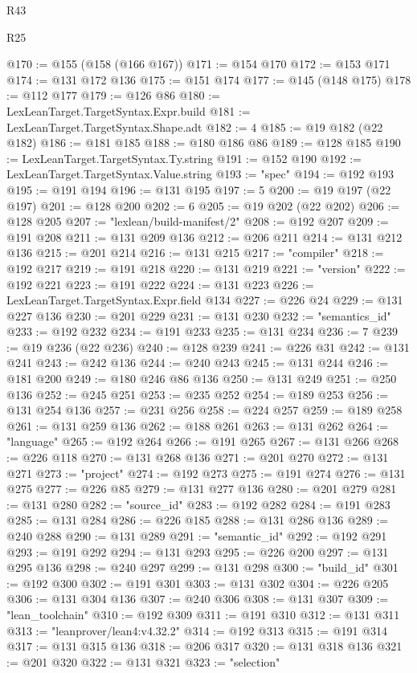 \begin{lexlean}{R43}
\begin{lexlean}{R25}
\begin{coremodule}
{{{{{{{{{{{{{{{{{{{{{{{{{{{{{{{{{{{{{{{{{{{{{{{{{{{{{{{{{{{{{{{{{{{{{{{{{{{{{{{{{{{{{{{{{{{{{{{{{{{{{{{{{{{{{{{{{{{{{{{{{{{{{{{{{{{{{{{{{{{{{{{{{{{{{{{{{{{{{{{{{{{{{{{{{{{{{{{{{{{{{{{{{{{{{{{{{@170 := @155 (@158 (@166 @167))
@171 := @154 @170
@172 := @153 @171
@174 := @131 @172 @136
@175 := @151 @174
@177 := @145 (@148 @175)
@178 := @112 @177
@179 := @126 @86
@180 := LexLeanTarget.TargetSyntax.Expr.build
@181 := LexLeanTarget.TargetSyntax.Shape.adt
@182 := 4
@185 := @19 @182 (@22 @182)
@186 := @181 @185
@188 := @180 @186 @86
@189 := @128 @185
@190 := LexLeanTarget.TargetSyntax.Ty.string
@191 := @152 @190
@192 := LexLeanTarget.TargetSyntax.Value.string
@193 := "spec"
@194 := @192 @193
@195 := @191 @194
@196 := @131 @195
@197 := 5
@200 := @19 @197 (@22 @197)
@201 := @128 @200
@202 := 6
@205 := @19 @202 (@22 @202)
@206 := @128 @205
@207 := "lexlean/build-manifest/2"
@208 := @192 @207
@209 := @191 @208
@211 := @131 @209 @136
@212 := @206 @211
@214 := @131 @212 @136
@215 := @201 @214
@216 := @131 @215
@217 := "compiler"
@218 := @192 @217
@219 := @191 @218
@220 := @131 @219
@221 := "version"
@222 := @192 @221
@223 := @191 @222
@224 := @131 @223
@226 := LexLeanTarget.TargetSyntax.Expr.field @134
@227 := @226 @24
@229 := @131 @227 @136
@230 := @201 @229
@231 := @131 @230
@232 := "semantics_id"
@233 := @192 @232
@234 := @191 @233
@235 := @131 @234
@236 := 7
@239 := @19 @236 (@22 @236)
@240 := @128 @239
@241 := @226 @31
@242 := @131 @241
@243 := @242 @136
@244 := @240 @243
@245 := @131 @244
@246 := @181 @200
@249 := @180 @246 @86 @136
@250 := @131 @249
@251 := @250 @136
@252 := @245 @251
@253 := @235 @252
@254 := @189 @253
@256 := @131 @254 @136
@257 := @231 @256
@258 := @224 @257
@259 := @189 @258
@261 := @131 @259 @136
@262 := @188 @261
@263 := @131 @262
@264 := "language"
@265 := @192 @264
@266 := @191 @265
@267 := @131 @266
@268 := @226 @118
@270 := @131 @268 @136
@271 := @201 @270
@272 := @131 @271
@273 := "project"
@274 := @192 @273
@275 := @191 @274
@276 := @131 @275
@277 := @226 @85
@279 := @131 @277 @136
@280 := @201 @279
@281 := @131 @280
@282 := "source_id"
@283 := @192 @282
@284 := @191 @283
@285 := @131 @284
@286 := @226 @185
@288 := @131 @286 @136
@289 := @240 @288
@290 := @131 @289
@291 := "semantic_id"
@292 := @192 @291
@293 := @191 @292
@294 := @131 @293
@295 := @226 @200
@297 := @131 @295 @136
@298 := @240 @297
@299 := @131 @298
@300 := "build_id"
@301 := @192 @300
@302 := @191 @301
@303 := @131 @302
@304 := @226 @205
@306 := @131 @304 @136
@307 := @240 @306
@308 := @131 @307
@309 := "lean_toolchain"
@310 := @192 @309
@311 := @191 @310
@312 := @131 @311
@313 := "leanprover/lean4:v4.32.2"
@314 := @192 @313
@315 := @191 @314
@317 := @131 @315 @136
@318 := @206 @317
@320 := @131 @318 @136
@321 := @201 @320
@322 := @131 @321
@323 := "selection"
}}}}}}}}}}}}}}}}}}}}}}}}}}}}}}}}}}}}}}}}}}}}}}}}}}}}}}}}}}}}}}}}}}}}}}}}}}}}}}}}}}}}}}}}}}}}}}}}}}}}}}}}}}}}}}}}}}}}}}}}}}}}}}}}}}}}}}}}}}}}}}}}}}}}}}}}}}}}}}}}}}}}}}}}}}}}}}}}}}}}}}}}}}}}}}}}}
\end{coremodule}
\end{lexlean}
\end{lexlean}
